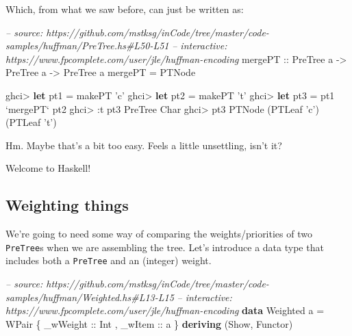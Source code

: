 \documentclass[]{article}
\newenvironment{Shaded}{}{}
\newcommand{\KeywordTok}[1]{\textcolor[rgb]{0.00,0.44,0.13}{\textbf{#1}}}
\newcommand{\DataTypeTok}[1]{\textcolor[rgb]{0.56,0.13,0.00}{#1}}
\newcommand{\CharTok}[1]{\textcolor[rgb]{0.25,0.44,0.63}{#1}}
\newcommand{\CommentTok}[1]{\textcolor[rgb]{0.38,0.63,0.69}{\textit{#1}}}
\newcommand{\OtherTok}[1]{\textcolor[rgb]{0.00,0.44,0.13}{#1}}
\newcommand{\FunctionTok}[1]{\textcolor[rgb]{0.02,0.16,0.49}{#1}}
\newcommand{\NormalTok}[1]{#1}
\begin{document}
Which, from what we saw before, can just be written as:

\begin{Shaded}
\begin{Highlighting}[]
\CommentTok{-- source: https://github.com/mstksg/inCode/tree/master/code-samples/huffman/PreTree.hs#L50-L51}
\CommentTok{-- interactive: https://www.fpcomplete.com/user/jle/huffman-encoding}
\OtherTok{mergePT ::} \DataTypeTok{PreTree}\NormalTok{ a }\OtherTok{->} \DataTypeTok{PreTree}\NormalTok{ a }\OtherTok{->} \DataTypeTok{PreTree}\NormalTok{ a}
\NormalTok{mergePT }\FunctionTok{=} \DataTypeTok{PTNode}
\end{Highlighting}
\end{Shaded}

\begin{Shaded}
\begin{Highlighting}[]
\NormalTok{ghci}\FunctionTok{>} \KeywordTok{let}\NormalTok{ pt1 }\FunctionTok{=}\NormalTok{ makePT }\CharTok{'c'}
\NormalTok{ghci}\FunctionTok{>} \KeywordTok{let}\NormalTok{ pt2 }\FunctionTok{=}\NormalTok{ makePT }\CharTok{'t'}
\NormalTok{ghci}\FunctionTok{>} \KeywordTok{let}\NormalTok{ pt3 }\FunctionTok{=}\NormalTok{ pt1 }\OtherTok{`mergePT`}\NormalTok{ pt2}
\NormalTok{ghci}\FunctionTok{>} \FunctionTok{:}\NormalTok{t pt3}
\DataTypeTok{PreTree} \DataTypeTok{Char}
\NormalTok{ghci}\FunctionTok{>}\NormalTok{ pt3}
\DataTypeTok{PTNode}\NormalTok{ (}\DataTypeTok{PTLeaf} \CharTok{'c'}\NormalTok{) (}\DataTypeTok{PTLeaf} \CharTok{'t'}\NormalTok{)}
\end{Highlighting}
\end{Shaded}

Hm. Maybe that's a bit too easy. Feels a little unsettling, isn't it?

Welcome to Haskell!

\subsection{Weighting things}\label{weighting-things}

We're going to need some way of comparing the weights/priorities of two
\texttt{PreTree}s when we are assembling the tree. Let's introduce a data type
that includes both a \texttt{PreTree} and an (integer) weight.

\begin{Shaded}
\begin{Highlighting}[]
\CommentTok{-- source: https://github.com/mstksg/inCode/tree/master/code-samples/huffman/Weighted.hs#L13-L15}
\CommentTok{-- interactive: https://www.fpcomplete.com/user/jle/huffman-encoding}
\KeywordTok{data} \DataTypeTok{Weighted}\NormalTok{ a }\FunctionTok{=} \DataTypeTok{WPair}\NormalTok{ \{}\OtherTok{ _wWeight ::} \DataTypeTok{Int}
\NormalTok{                        ,}\OtherTok{ _wItem   ::}\NormalTok{ a}
\NormalTok{                        \} }\KeywordTok{deriving}\NormalTok{ (}\DataTypeTok{Show}\NormalTok{, }\DataTypeTok{Functor}\NormalTok{)}
\end{Highlighting}
\end{Shaded}
\end{document}
